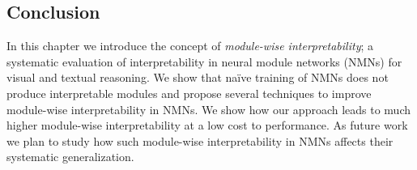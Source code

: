 \documentclass[main.tex]{subfiles}
\begin{document}
\subsection{Conclusion}
In this chapter we introduce the concept of \emph{module-wise interpretability}; a systematic evaluation of interpretability in neural module networks (NMNs) for visual and textual reasoning. We show that na\"ive training of NMNs does not produce interpretable modules and propose several techniques to improve module-wise interpretability in NMNs.
We show how our approach leads to much higher  module-wise interpretability at a low cost to performance.
As future work we plan to study how such module-wise interpretability in NMNs affects their systematic generalization.


\biblio
\end{document}
